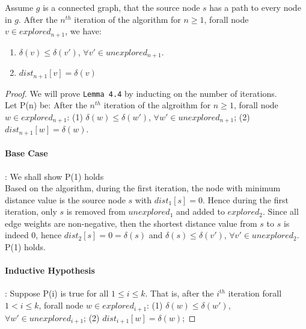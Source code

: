 \begin{sublemma}
Assume $g$ is a connected graph, that the source node $s$ has a path to every node in $g$. After the $n^{th}$ iteration of the algorithm for $n \geq 1$, forall node $v \in explored_{n+1}$, we have:
\begin{enumerate}
  \item $\delta(v) \leq \delta(v')$, $\forall v' \in unexplored_{n+1}$.
  \item $dist_{n+1}[v] = \delta(v)$
\end{enumerate}
\end{sublemma}
\begin{proof}
We will prove \texttt{Lemma 4.4} by inducting on the number of iterations. 
\\
Let P(n) be: After the $n^{th}$ iteration of the algroithm for $n \geq 1$, forall node $w \in explored_{n+1}$: (1) $\delta(w) \leq \delta(w')$, $\forall w' \in unexplored_{n+1}$; (2) $dist_{n+1}[w] = \delta(w)$. 


\paragraph*{Base Case}: We shall show P(1) holds \\
Based on the algorithm, during the first iteration, the node with minimum distance value is the source node $s$ with $dist_1[s] = 0$. Hence during the first iteration, only $s$ is removed from $unexplored_1$ and added to $explored_2$. Since all edge weights are non-negative, then the shortest distance value from $s$ to $s$ is indeed $0$, hence $dist_2[s] = 0 = \delta(s)$ and $\delta(s) \leq \delta(v')$, $\forall v' \in unexplored_2$. 
\\
P(1) holds.



\paragraph*{Inductive Hypothesis}: Suppose P(i) is true for all $1 \leq i \leq k$. That is, after the $i^{th}$ iteration forall $1 < i \leq k$, forall node $w \in explored_{i+1}$: (1) $\delta(w) \leq \delta(w')$, $\forall w' \in unexplored_{i+1}$; (2) $dist_{i+1}[w] = \delta(w)$; %



\end{proof}
